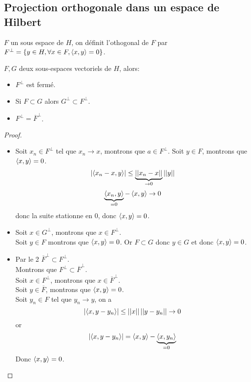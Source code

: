 \subsection{Projection orthogonale dans un espace de Hilbert}

\begin{definition}
	$F$ un sous espace de $H$, on définit l'othogonal de $F$ par $F^\perp = \{y \in H, \forall x \in F, \left\langle x, y \right\rangle = 0\}$.
\end{definition}

\begin{prop}
	$F, G$ deux sous-espaces vectoriels de $H$, alors:
	\begin{itemize}
		\item $F^\perp$ est fermé.
		\item Si $F \subset G$ alors $G^\perp \subset F^\perp$.
		\item $F^\perp = \overline{F}^\perp$.
	\end{itemize}
\end{prop}


\begin{proof}
	\begin{itemize}
		\item Soit $x_n \in F^\perp$ tel que $x_n \to x$, montrons que $a \in F^\perp$.
		      Soit $y \in F$, montrons que $\left\langle x, y \right\rangle = 0$.
		      $$ \left|\left\langle x_n-x, y \right\rangle\right| \leq  \underbrace{\left|\left|x_n-x\right|\right|}_{\to 0} \left|\left|y\right|\right| $$
		      $$ \underbrace{\left\langle x_n, y \right\rangle}_{=0} - \left\langle x, y \right\rangle  \to 0 $$
		      donc la suite stationne en 0, donc $\left\langle x, y \right\rangle = 0$.

		\item Soit $x \in G^\perp$, montrons que $x \in F^\perp$.\\
		      Soit $y \in F$ montrons que $\left\langle x, y \right\rangle = 0$. Or $F \subset G$ donc $y \in G$ et donc $\left\langle x, y \right\rangle = 0$.
		\item Par le 2 $\overline{F}^\perp \subset F^\perp$.\\
		      Montrons que $F^\perp \subset \overline{F}^\perp$.\\
		      Soit $x \in F^\perp$, montrons que $x \in \overline{F}^\perp$.\\
		      Soit $y \in \overline{F}$, montrons que $\left\langle x, y \right\rangle = 0$.\\
		      Soit $y_n \in F$ tel que $y_n \to y$, on a
		      $$ \left|\left\langle x, y- y_n \right\rangle\right| \leq \left|\left|x\right|\right| \left|\left|y-y_n\right|\right| \to 0 $$
		      or
		      $$  \left|\left\langle x, y- y_n \right\rangle\right| = \left\langle x, y \right\rangle -  \underbrace{\left\langle x, y_n \right\rangle}_{=0} $$
		      Donc $\left\langle x, y \right\rangle = 0$.
	\end{itemize}
\end{proof}

